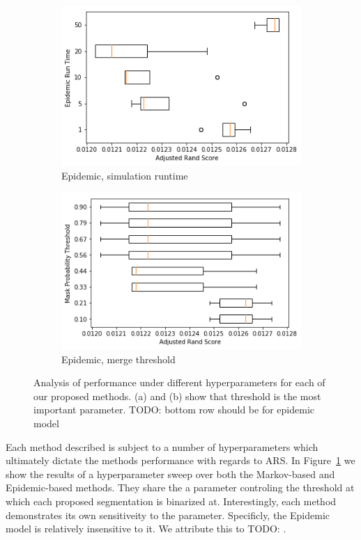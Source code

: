 \documentclass[twocolumn]{article}
\newcommand{\todo}[1]{}
\renewcommand{\todo}[1]{{\color{red} TODO: {#1}}}
\newcommand{\figref}[1]{Figure~\ref{fig:#1}}
\newcommand{\figlab}[1]{\label{fig:#1}}
\begin{document}
\begin{figure}[t!]
  \begin{subfigure}{0.49\linewidth}
    \includegraphics[width=\linewidth]{figs/epidemic_run.png}
    \caption{Epidemic, simulation runtime}
  \end{subfigure}
  \begin{subfigure}{0.49\linewidth}
    \includegraphics[width=\linewidth]{figs/epidemic_thresh.png}
    \caption{Epidemic, merge threshold}
  \end{subfigure}

  \caption{
    Analysis of performance under different hyperparameters for each of our proposed methods. (a) and (b) show that threshold
    is the most important parameter. \todo{bottom row should be for epidemic model}
  }
  \figlab{param_sweep}

\end{figure}

Each method described is subject to a number of hyperparameters which ultimately 
dictate the methods performance with regards to ARS. In \figref{param_sweep} we
show the results of a hyperparameter sweep over both the Markov-based and
Epidemic-based methods. They share the a parameter controling the threshold at
which each proposed segmentation is binarized at. Interestingly, each method
demonstrates its own sensitiveity to the parameter. Specificly, the Epidemic
model is relatively insensitive to it. We attribute this to \todo{}.
\end{document}
